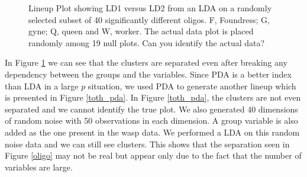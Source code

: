 \documentclass[12]{article}
\begin{document}
\begin{figure}[hbtp]
   \centering
       \caption{Lineup Plot showing LD1 versus LD2 from an LDA on a randomly selected subset of 40 significantly different oligos. F, Foundress; G, gyne; Q, queen and W, worker. The actual data plot is placed randomly among 19 null plots. Can you identify the actual data?  }
       \label{toth_lineup}
\end{figure} 

In Figure \ref{toth_lineup} we can see that the clusters are separated even after breaking any dependency between the groups and the variables. Since PDA is a better index than LDA in a large $p$ situation, we used PDA to generate another lineup which is presented in Figure \ref{toth_pda}. In Figure \ref{toth_pda}, the clusters are not even separated and we cannot identify the true plot. We also generated 40 dimensions of random noise with 50 observations in each dimension. A group variable is also added as the one present in the wasp data. We performed a LDA on this random noise data and we can still see clusters.  This shows that the separation seen in Figure \ref{oligo} may not be real but appear only due to the fact that the number of variables are large.
\end{document}
